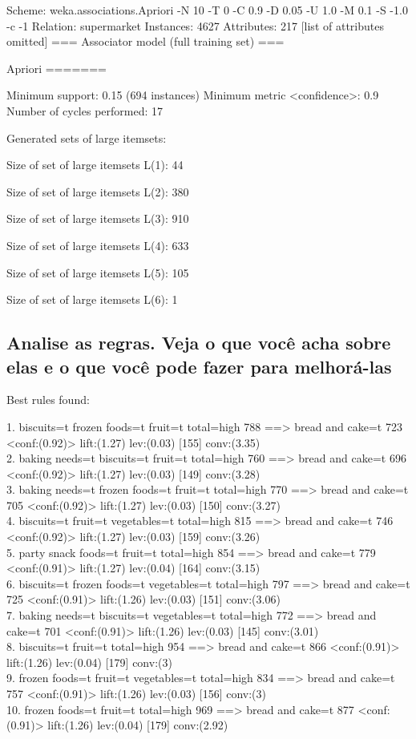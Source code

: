 \documentclass[12pt]{article}
\begin{document}
Scheme:       weka.associations.Apriori -N 10 -T 0 -C 0.9 -D 0.05 -U 1.0 -M 0.1 -S -1.0 -c -1
Relation:     supermarket
Instances:    4627
Attributes:   217
              [list of attributes omitted]
=== Associator model (full training set) ===


Apriori
=======

Minimum support: 0.15 (694 instances)
Minimum metric <confidence>: 0.9
Number of cycles performed: 17

Generated sets of large itemsets:

Size of set of large itemsets L(1): 44

Size of set of large itemsets L(2): 380

Size of set of large itemsets L(3): 910

Size of set of large itemsets L(4): 633

Size of set of large itemsets L(5): 105

Size of set of large itemsets L(6): 1

\subsection{Analise as regras. Veja o que você acha sobre elas e o que você pode fazer para melhorá-las}
Best rules found:

 1. biscuits=t frozen foods=t fruit=t total=high 788 ==> bread and cake=t 723    <conf:(0.92)> lift:(1.27) lev:(0.03) [155] conv:(3.35)\\
 2. baking needs=t biscuits=t fruit=t total=high 760 ==> bread and cake=t 696    <conf:(0.92)> lift:(1.27) lev:(0.03) [149] conv:(3.28)\\
 3. baking needs=t frozen foods=t fruit=t total=high 770 ==> bread and cake=t 705    <conf:(0.92)> lift:(1.27) lev:(0.03) [150] conv:(3.27)\\
 4. biscuits=t fruit=t vegetables=t total=high 815 ==> bread and cake=t 746    <conf:(0.92)> lift:(1.27) lev:(0.03) [159] conv:(3.26)\\
 5. party snack foods=t fruit=t total=high 854 ==> bread and cake=t 779    <conf:(0.91)> lift:(1.27) lev:(0.04) [164] conv:(3.15)\\
 6. biscuits=t frozen foods=t vegetables=t total=high 797 ==> bread and cake=t 725    <conf:(0.91)> lift:(1.26) lev:(0.03) [151] conv:(3.06)\\
 7. baking needs=t biscuits=t vegetables=t total=high 772 ==> bread and cake=t 701    <conf:(0.91)> lift:(1.26) lev:(0.03) [145] conv:(3.01)\\
 8. biscuits=t fruit=t total=high 954 ==> bread and cake=t 866    <conf:(0.91)> lift:(1.26) lev:(0.04) [179] conv:(3)\\
 9. frozen foods=t fruit=t vegetables=t total=high 834 ==> bread and cake=t 757    <conf:(0.91)> lift:(1.26) lev:(0.03) [156] conv:(3)\\
10. frozen foods=t fruit=t total=high 969 ==> bread and cake=t 877    <conf:(0.91)> lift:(1.26) lev:(0.04) [179] conv:(2.92)\\
\end{document}
